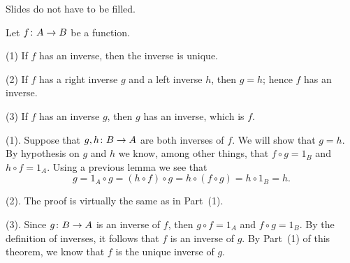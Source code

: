\documentclass[12pt, oneside, reqno]{article}
\begin{document}
Slides do not have to be filled.


\thm\label{thmAA} 
Let ${f} \colon {A} \to {B}$ be a function.
%
\enum 
\item[(1)] If $f$ has an inverse, then the inverse is unique.
%
\item[(2)] If $f$ has a right inverse $g$ and a left inverse $h$, then $g = h$; hence $f$ has an inverse.
%
\item[(3)] If $f$ has an inverse $g$, then $g$ has an inverse, which is $f$.
\eenum
\ethm
 
\demo
(1). Suppose that ${g, h} \colon {B} \to {A}$ are both inverses of $f$.  We will show that $g = h$.  By hypothesis on $g$ and $h$ we know, among other things, that $f \circ g = 1_B$ and $h \circ f = 1_A$.  Using a previous lemma we see that
%
\[
g  =  1_A \circ g  =  (h \circ f) \circ g  =  h \circ (f \circ g)  =  h \circ 1_B  =  h.
\]

\noindent (2). The proof is virtually the same as in Part~(1).  
\spce

\noindent (3).  Since ${g} \colon {B} \to {A}$ is an inverse of $f$, then $g \circ f = 1_A$ and $f \circ g = 1_B$.  By the definition of inverses, it follows that $f$ is an inverse of $g$.  By Part~(1) of this theorem, we know that $f$ is the unique inverse of $g$.
\edemo

\begin{bibliog}




\end{bibliog}
\end{document}
